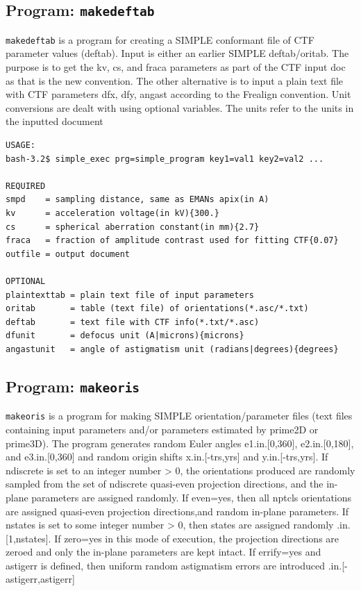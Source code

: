 \documentclass[a4paper,11pt]{article}
\newcommand{\prgname}[1]{\textcolor{NavyBlue}{\texttt{#1}}}
\begin{document}
\subsection{Program: \prgname{makedeftab}}
\label{makedeftab}
\prgname{makedeftab} is a program for creating a SIMPLE conformant file of CTF parameter values (deftab). Input is either an earlier SIMPLE deftab/oritab. The purpose is to get the kv, cs, and fraca parameters as part of the CTF input doc as that is the new convention. The other alternative is to input a plain text file with CTF parameters dfx, dfy, angast according to the Frealign convention. Unit conversions are dealt with using optional variables. The units refer to the units in the inputted document

\begin{verbatim}
USAGE:
bash-3.2$ simple_exec prg=simple_program key1=val1 key2=val2 ...

REQUIRED
smpd    = sampling distance, same as EMANs apix(in A)
kv      = acceleration voltage(in kV){300.}
cs      = spherical aberration constant(in mm){2.7}
fraca   = fraction of amplitude contrast used for fitting CTF{0.07}
outfile = output document

OPTIONAL
plaintexttab = plain text file of input parameters
oritab       = table (text file) of orientations(*.asc/*.txt)
deftab       = text file with CTF info(*.txt/*.asc)
dfunit       = defocus unit (A|microns){microns}
angastunit   = angle of astigmatism unit (radians|degrees){degrees}
\end{verbatim}

\subsection{Program: \prgname{makeoris}}
\label{makeoris}
\prgname{makeoris} is a program for making SIMPLE orientation/parameter files (text files containing input parameters and/or parameters estimated by prime2D or prime3D). The program generates random Euler angles e1.in.[0,360], e2.in.[0,180], and e3.in.[0,360] and random origin shifts x.in.[-trs,yrs] and y.in.[-trs,yrs]. If ndiscrete is set to an integer number > 0, the orientations produced are randomly sampled from the set of ndiscrete quasi-even projection directions, and the in-plane parameters are assigned randomly. If even=yes, then all nptcls orientations are assigned quasi-even projection directions,and random in-plane parameters. If nstates is set to some integer number > 0, then states are assigned randomly .in.[1,nstates]. If zero=yes in this mode of execution, the projection directions are zeroed and only the in-plane parameters are kept intact. If errify=yes and astigerr is defined, then uniform random astigmatism errors are introduced .in.[-astigerr,astigerr]
\end{document}
